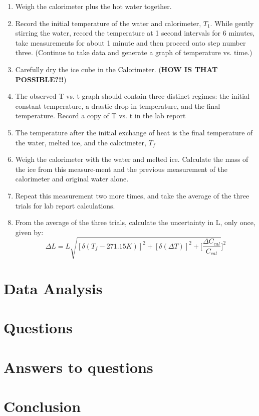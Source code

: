 \documentclass[12pt]{report}
\begin{document}
\begin{enumerate}
	\item Weigh the calorimeter plus the hot water together.
	\item Record the initial temperature of the water and calorimeter, $T_1$. While gently stirring the water, record the
temperature at 1 second intervals for 6 minutes, take measurements for about 1 minute and then proceed onto
step number three. (Continue to take data and generate a graph of temperature vs. time.)
	\item Carefully dry the ice cube in the Calorimeter. (\textbf{HOW IS THAT POSSIBLE?!!})
	\item The observed T vs. t graph should contain three distinct regimes: the initial constant temperature, a
drastic drop in temperature, and the final temperature. Record a copy of T vs. t in the lab report
	\item The temperature after the initial exchange of heat is the final temperature of the water, melted ice, and the
calorimeter, $T_f$
	\item Weigh the calorimeter with the water and melted ice. Calculate the mass of the ice from this measure-ment
and the previous measurement of the calorimeter and original water alone.
	\item Repeat this measurement two more times, and take the average of the three trials for lab report calculations.
	\item From the average of the three trials, calculate the uncertainty in L, only once, given by: 
		\[ \Delta L = L\sqrt{ [\delta (T_f - 271.15K)]^2 + [\delta (\Delta T)]^2 + [\frac{ \Delta C_{cal}}{C_{cal}}}]^2\]
\end{enumerate}



\section{Data Analysis}
	
\section{Questions}

\section{Answers to questions}

\section{Conclusion}
\end{document}
